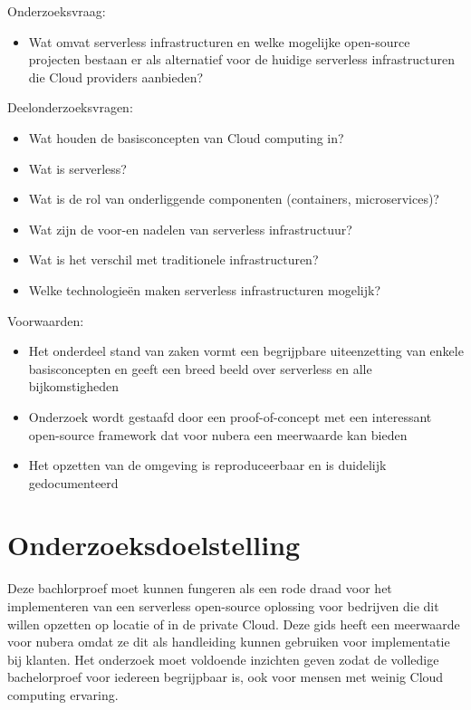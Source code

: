 Onderzoeksvraag: 
\begin{itemize}
    \item Wat omvat serverless infrastructuren en welke mogelijke open-source projecten bestaan er als alternatief voor de huidige serverless infrastructuren die Cloud providers aanbieden?
\end{itemize}

Deelonderzoeksvragen: 
\begin{itemize}
    \item Wat houden de basisconcepten van Cloud computing in?
    \item Wat is serverless?
    \item Wat is de rol van onderliggende componenten (containers, microservices)?
    \item Wat zijn de voor-en nadelen van serverless infrastructuur?
    \item Wat is het verschil met traditionele infrastructuren?
    \item Welke technologieën maken serverless infrastructuren mogelijk?
\end{itemize}

Voorwaarden: 
\begin{itemize}
    \item Het onderdeel stand van zaken vormt een begrijpbare uiteenzetting van enkele basisconcepten en geeft een breed beeld over serverless en alle bijkomstigheden
    \item Onderzoek wordt gestaafd door een proof-of-concept met een interessant open-source framework dat voor nubera een meerwaarde kan bieden
    \item Het opzetten van de omgeving is reproduceerbaar en is duidelijk gedocumenteerd
\end{itemize}



\section{Onderzoeksdoelstelling}
\label{sec:onderzoeksdoelstelling}

Deze bachlorproef moet kunnen fungeren als een rode draad voor het implementeren van een serverless open-source oplossing voor bedrijven die dit willen opzetten op locatie of in de private Cloud. Deze gids heeft een meerwaarde voor nubera omdat ze dit als handleiding kunnen gebruiken voor implementatie bij klanten. Het onderzoek moet voldoende inzichten geven zodat de volledige bachelorproef voor iedereen begrijpbaar is, ook voor mensen met weinig Cloud computing ervaring.



